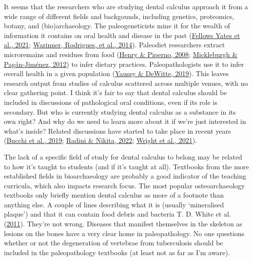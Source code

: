 \documentclass[
  letterpaper,
]{book}
\begin{document}
It seems that the researchers who are studying dental calculus approach
it from a wide range of different fields and backgounds, including
genetics, proteomics, botany, and (bio)archaeology. The paleogeneticists
mine it for the wealth of information it contains on oral health and
disease in the past
(\protect\hyperlink{ref-yatesOralMicrobiome2021}{Fellows Yates et al.,
2021}; \protect\hyperlink{ref-warinnerPathogensHost2014}{Warinner,
Rodrigues, et al., 2014}). Paleodiet researchers extract microremains
and residues from food
(\protect\hyperlink{ref-henryCalculusSyria2008}{Henry \& Piperno, 2008};
\protect\hyperlink{ref-mickleburghNewInsights2012}{Mickleburgh \&
Pagán-Jiménez, 2012}) to infer dietary practices. Paleopathologists use
it to infer overall health in a given population
(\protect\hyperlink{ref-yaussyCalculusSurvivorship2019}{Yaussy \&
DeWitte, 2019}). This leaves research output from studies of calculus
scattered across multiple venues, with no clear gathering point. I think
it's fair to say that dental calculus should be included in discussions
of pathological oral conditions, even if its role is secondary. But who
is currently studying dental calculus as a substance in its own right?
And why do we need to learn more about it if we're just interested in
what's inside? Related discussions have started to take place in recent
years (\protect\hyperlink{ref-bucchiComparisonsMethods2019}{Bucchi et
al., 2019}; \protect\hyperlink{ref-radiniDirtyTeeth2022}{Radini \&
Nikita, 2022};
\protect\hyperlink{ref-wrightAdvancingRefining2021}{Wright et al.,
2021}).

The lack of a specific field of study for dental calculus to belong may
be related to how it's taught to students (and if it's taught at all).
Textbooks from the more established fields in bioarchaeology are
probably a good indicator of the teaching curricula, which also impacts
research focus. The most popular osteoarchaeology textbooks only briefly
mention dental calculus as more of a footnote than anything else. A
couple of lines describing what it is (usually `mineralised plaque') and
that it can contain food debris and bacteria T. D. White et al.
(\protect\hyperlink{ref-whiteHumanOsteology2011}{2011}). They're not
wrong. Diseases that manifest themselves in the skeleton as lesions on
the bones have a very clear home in paleopathology. No one questions
whether or not the degeneration of vertebrae from tuberculosis should be
included in the paleopathology textbooks (at least not as far as I'm
aware).
\end{document}
